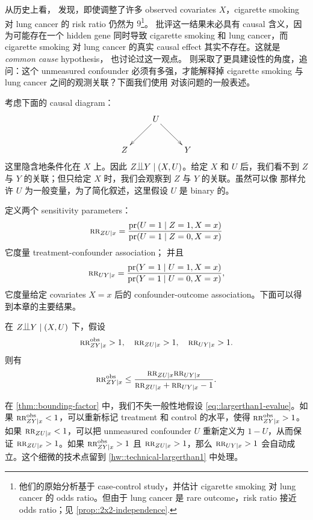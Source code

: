 从历史上看，\citet{doll1950smoking} 发现，即使调整了许多 observed covariates $X$，cigarette smoking 对 lung cancer 的 risk ratio 仍然为 $9$\footnote{他们的原始分析基于 case-control study，并估计 cigarette smoking 对 lung cancer 的 odds ratio。但由于 lung cancer 是 rare outcome，risk ratio 接近 odds ratio；见 \cref{prop::2x2-independence}.}。\citet{Fisher::1957} 批评这一结果未必具有 causal 含义，因为可能存在一个 hidden gene 同时导致 cigarette smoking 和 lung cancer，而 cigarette smoking 对 lung cancer 的真实 causal effect 其实不存在。这就是 {\it common cause} hypothesis，\citet{reichenbach1991direction} 也讨论过这一观点。\citet{Cornfield::1959} 则采取了更具建设性的角度，追问：这个 unmeasured confounder 必须有多强，才能解释掉 cigarette smoking 与 lung cancer 之间的观测关联？下面我们使用 \citet{ding2016sensitivity} 对该问题的一般表述。


考虑下面的 causal diagram：
$$
\xymatrix{
 &U \ar[dl] \ar[dr] \\
 Z   && Y 
}
$$
这里隐含地条件化在 $X$ 上。因此 $Z\ind Y\mid (X, U)$。给定 $X$ 和 $U$ 后，我们看不到 $Z$ 与 $Y$ 的关联；但只给定 $X$ 时，我们会观察到 $Z$ 与 $Y$ 的关联。虽然可以像 \citet{ding2016sensitivity} 那样允许 $U$ 为一般变量，为了简化叙述，这里假设 $U$ 是 binary 的。


定义两个 sensitivity parameters：
$$
\textsc{rr}_{ZU\mid x} = \frac{ \textup{pr}(U=1\mid Z=1,X=x) }{ \textup{pr}(U=1\mid Z=0,X=x)  } 
$$
它度量 treatment-confounder association；
并且
$$
\textsc{rr}_{UY\mid x} = \frac{  \textup{pr}(Y=1\mid U=1, X=x) }{  \textup{pr}(Y=1\mid U=0, X=x) },
$$
它度量给定 covariates $X=x$ 后的 confounder-outcome association。下面可以得到本章的主要结果。

\begin{theorem}\label{thm::bounding-factor}
在 $Z\ind Y\mid (X, U)$ 下，假设
\begin{equation}\label{eq::largerthan1-evalue}
\textsc{rr}_{ZY\mid x}^{\textup{obs}} > 1, \quad
 \textsc{rr}_{ZU\mid x} > 1,\quad 
 \textsc{rr}_{UY\mid x} > 1.
\end{equation}
则有
$$
\textsc{rr}_{ZY\mid x}^{\textup{obs}} \leq \frac{ \textsc{rr}_{ZU\mid x}  \textsc{rr}_{UY\mid x} }{  \textsc{rr}_{ZU\mid x} + \textsc{rr}_{UY\mid x} - 1} .
$$
\end{theorem}

在 \cref{thm::bounding-factor} 中，我们不失一般性地假设 \eqref{eq::largerthan1-evalue}。如果 $\textsc{rr}_{ZY\mid x}^{\textup{obs}} < 1$，可以重新标记 treatment 和 control 的水平，使得 $\textsc{rr}_{ZY\mid x}^{\textup{obs}} > 1$。如果 $  \textsc{rr}_{ZU\mid x}  < 1$，可以把 unmeasured confounder $U$ 重新定义为 $1-U$，从而保证 $   \textsc{rr}_{ZU\mid x}  > 1$。如果 $\textsc{rr}_{ZY\mid x}^{\textup{obs}} > 1$ 且 $ \textsc{rr}_{ZU\mid x} > 1$，那么 $ \textsc{rr}_{UY\mid x}  > 1$ 会自动成立。这个细微的技术点留到 \cref{hw::technical-largerthan1} 中处理。


